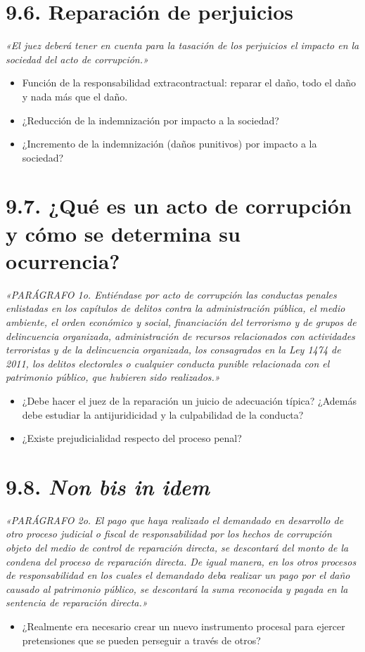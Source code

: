 \section{9.6. Reparación de perjuicios}
\begin{cita}
\textit{«El juez deberá tener en cuenta para la tasación de los perjuicios el impacto en la sociedad del acto de corrupción.»}
\end{cita}
\begin{itemize}
\item Función de la responsabilidad extracontractual: reparar el daño, todo el daño y nada más que el daño.
\item ¿Reducción de la indemnización por impacto a la sociedad?
\item ¿Incremento de la indemnización (daños punitivos) por impacto a la sociedad?
\end{itemize}
\section{9.7. ¿Qué es un acto de corrupción y cómo se determina su ocurrencia?}
\begin{cita}
\textit{«PARÁGRAFO 1o. Entiéndase por acto de corrupción las conductas penales enlistadas en los capítulos de delitos contra la administración pública, el medio ambiente, el orden económico y social, financiación del terrorismo y de grupos de delincuencia organizada, administración de recursos relacionados con actividades terroristas y de la delincuencia organizada, los consagrados en la Ley 1474 de 2011, los delitos electorales o cualquier conducta punible relacionada con el patrimonio público, que hubieren sido realizados.»}
\end{cita}
\begin{itemize}
\item ¿Debe hacer el juez de la reparación un juicio de adecuación típica? ¿Además debe estudiar la antijuridicidad y la culpabilidad de la conducta?
\item ¿Existe prejudicialidad respecto del proceso penal?
\end{itemize}
\section{9.8. \textit{Non bis in idem}}
\begin{cita}
\textit{«PARÁGRAFO 2o. El pago que haya realizado el demandado en desarrollo de otro proceso judicial o fiscal de responsabilidad por los hechos de corrupción objeto del medio de control de reparación directa, se descontará del monto de la condena del proceso de reparación directa. De igual manera, en los otros procesos de responsabilidad en los cuales el demandado deba realizar un pago por el daño causado al patrimonio público, se descontará la suma reconocida y pagada en la sentencia de reparación directa.»}
\end{cita}
\begin{itemize}
\item ¿Realmente era necesario crear un nuevo instrumento procesal para ejercer pretensiones que se pueden perseguir a través de otros?
\end{itemize}
